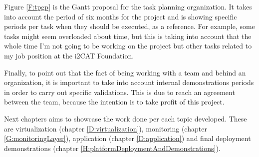 Figure \ref{F:tpgp} is the Gantt proposal for the task planning organization. It takes into account the period of six months for the project and is showing specific periods per task when they should be executed, as a reference. For example, some tasks might seem overloaded about time, but this is taking into account that the whole time I'm not going to be working on the project but other tasks related to my job position at the i2CAT Foundation.

Finally, to point out that the fact of being working with a team and behind an organization, it is important to take into account internal demonstrations periods in order to carry out specific validations. This is due to reach an agreement between the team, because the intention is to take profit of this project.

Next chapters aims to showcase the work done per each topic developed. These are virtualization (chapter \ref{D:virtualization}), monitoring (chapter \ref{G:monitoringLayer}), application (chapter \ref{D:application}) and final deployment demonstrations (chapter \ref{H:platformDeploymentAndDemonstrations}). 
